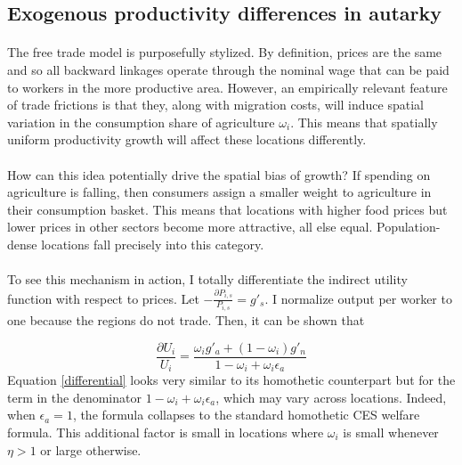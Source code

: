 \subsection{Exogenous productivity differences in autarky}
\paragraph*{}
The free trade model is purposefully stylized. By definition, prices are the same and so all backward linkages operate through the nominal wage that can be paid to workers in the more productive area. However, an empirically relevant feature of trade frictions is that they, along with migration costs, will induce spatial variation in the consumption share of agriculture $\omega_{i}$. This means that spatially uniform productivity growth will affect these locations differently.
\paragraph*{}
How can this idea potentially drive the spatial bias of growth? If spending on agriculture is falling, then consumers assign a smaller weight to agriculture in their consumption basket. This means that locations with higher food prices but lower prices in other sectors become more attractive, all else equal. Population-dense locations fall precisely into this category.
\paragraph*{}
To see this mechanism in action, I totally differentiate the indirect utility function with respect to prices. Let $-\frac{\partial P_{i, s}}{P_{i, s}} = g'_{s}$.  I normalize output per worker to one because the regions do not trade. Then, it can be shown that

\begin{equation}\label{differential}
	\frac{\partial U_{i}}{U_{i}} = \frac{\omega_{i}g'_{a} + (1-\omega_{i})g'_{n} }{1 - \omega_{i} + \omega_{i}\epsilon_{a}}
\end{equation}
Equation \eqref{differential} looks very similar to its homothetic counterpart but for the term in the denominator $1-\omega_{i} + \omega_{i}\epsilon_{a}$, which may vary across locations. Indeed, when $\epsilon_{a} = 1$, the formula collapses to the standard homothetic CES welfare formula. This additional factor is small in locations where $\omega_{i}$ is small whenever $\eta > 1$ or large otherwise. 


